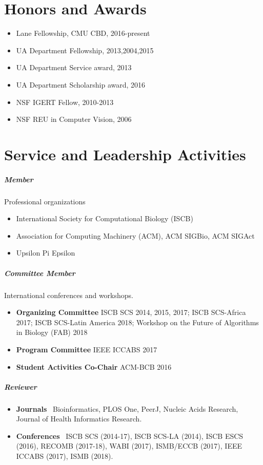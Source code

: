 \documentclass[10pt,letterpaper]{article}
\begin{document}
\section*{Honors and Awards}

\begin{itemize}
    \item Lane Fellowship, CMU CBD, 2016-present
    \item UA Department Fellowship, 2013,2004,2015
    \item UA Department Service award, 2013
    \item UA Department Scholarship award, 2016
    \item NSF IGERT Fellow, 2010-2013
    \item NSF REU in Computer Vision, 2006
\end{itemize}


\section*{Service and Leadership Activities}


\subparagraph{Member} Professional organizations
\begin{itemize}
\item International Society for Computational Biology (ISCB)
\item Association for Computing Machinery (ACM), ACM SIGBio, ACM SIGAct
\item Upsilon Pi Epsilon
\end{itemize}

\subparagraph{Committee Member} International conferences and workshops.
\begin{itemize}[leftmargin=!,labelindent=5pt,itemindent=-15pt]
    \item \textbf{Organizing Committee} ISCB SCS 2014, 2015, 2017; 
    ISCB SCS-Africa 2017;
    ISCB SCS-Latin America 2018;  
    Workshop on the Future of Algorithms in Biology (FAB) 2018
    \item \textbf{Program Committee} IEEE ICCABS 2017
    \item \textbf{Student Activities Co-Chair} ACM-BCB 2016
\end{itemize}

\subparagraph{Reviewer} 
\begin{itemize}[leftmargin=!,labelindent=5pt,itemindent=-15pt]
    \item \textbf{Journals} \ 
        Bioinformatics,
        PLOS One, 
        PeerJ, 
        Nucleic Acids Research,
        Journal of Health Informatics Research. 
    \item \textbf{Conferences} \ 
        ISCB SCS (2014-17), %
        ISCB SCS-LA (2014), %
        ISCB ESCS (2016), %
	RECOMB (2017-18), %
	WABI (2017), %
	ISMB/ECCB (2017), %
    	IEEE ICCABS (2017), %
	ISMB (2018). %
\end{itemize}
\end{document}
